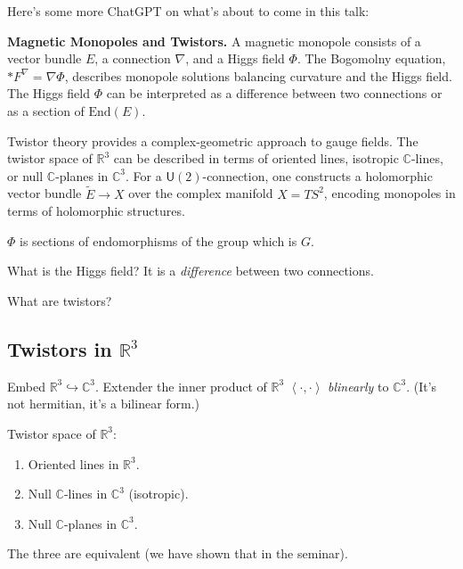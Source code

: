Here's some more ChatGPT on what's about to come in this talk:

\textbf{Magnetic Monopoles and Twistors.} A magnetic monopole consists of a vector bundle \(E\), a connection \(\nabla\), and a Higgs field \(\Phi\). The Bogomolny equation, \(*F^\nabla = \nabla \Phi\), describes monopole solutions balancing curvature and the Higgs field. The Higgs field \(\Phi\) can be interpreted as a difference between two connections or as a section of \(\text{End}(E)\).

Twistor theory provides a complex-geometric approach to gauge fields. The twistor space of \(\mathbb{R}^3\) can be described in terms of oriented lines, isotropic \(\mathbb{C}\)-lines, or null \(\mathbb{C}\)-planes in \(\mathbb{C}^3\). For a \(\mathsf{U}(2)\)-connection, one constructs a holomorphic vector bundle \(\tilde{E} \to X\) over the complex manifold \(X = TS^2\), encoding monopoles in terms of holomorphic structures.


\begin{remark}[Misha]\leavevmode
\(\Phi\) is sections of endomorphisms of the group which is \(G\).
\end{remark}

\begin{question}\leavevmode
What is the Higgs field? It is a \textit{difference} between two connections.
\end{question}

\begin{question}\leavevmode
What are twistors?
\end{question}

\subsection{Twistors in \( \mathbb{R}^3\)}

Embed \(\mathbb{R}^3 \hookrightarrow  \mathbb{C}^3\). Extender the inner product of \(\mathbb{R}^3\) \(\left<\cdot ,\cdot \right>\) \textit{blinearly} to \(\mathbb{C}^3\). (It's not hermitian, it's a bilinear form.)

Twistor space of \(\mathbb{R}^3\):

\begin{enumerate}
	\item Oriented lines in \(\mathbb{R}^3\).
\item Null \(\mathbb{C}\)-lines in \(\mathbb{C}^3\) (isotropic).
\item Null \(\mathbb{C}\)-planes in \(\mathbb{C}^3\).
\end{enumerate}
The three are equivalent (we have shown that in the seminar).

